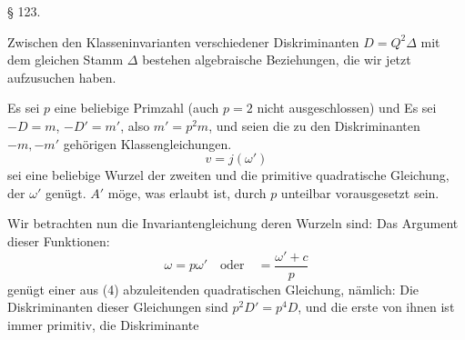 \begin{center}
§ 123. \\
\end{center}

Zwischen den Klasseninvarianten verschiedener Diskriminanten $D = Q^2\Delta$ mit dem gleichen Stamm $\Delta$ bestehen algebraische Beziehungen, die wir jetzt aufzusuchen haben.

Es sei $p$ eine beliebige Primzahl (auch $p = 2$ nicht ausgeschlossen) und
Es sei $-D = m$, $-D' = m'$, also $m' = p^2 m$, und
seien die zu den Diskriminanten $-m, -m'$ gehörigen Klassengleichungen.
\[
v = j(\omega')
\]
sei eine beliebige Wurzel der zweiten und
die primitive quadratische Gleichung, der $\omega'$ genügt. $A'$ möge, was erlaubt ist, durch $p$ unteilbar vorausgesetzt sein.

Wir betrachten nun die Invariantengleichung
deren Wurzeln sind:
Das Argument dieser Funktionen:
\[
\omega = p\omega' \quad \text{oder} \quad = \frac{\omega' + c}{p}
\]
genügt einer aus (4) abzuleitenden quadratischen Gleichung, nämlich:
Die Diskriminanten dieser Gleichungen sind $p^2D' = p^4D$, und die erste von ihnen ist immer primitiv, die Diskriminante
